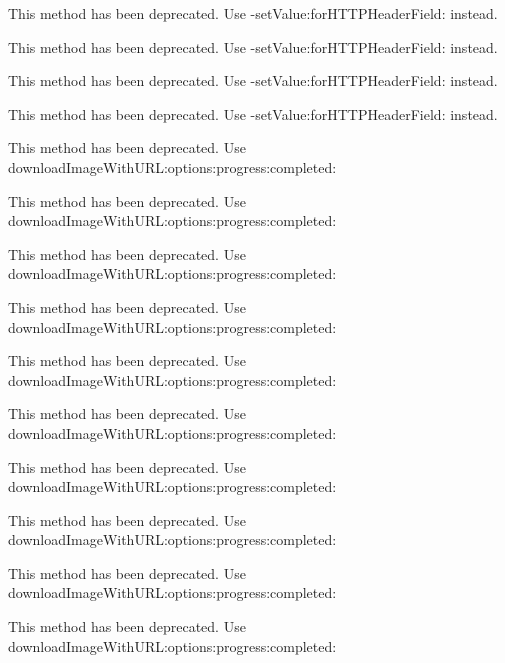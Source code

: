 \begin{DoxyRefList}
This method has been deprecated. Use -\/set\+Value\+:for\+H\+T\+T\+P\+Header\+Field\+: instead. 

This method has been deprecated. Use -\/set\+Value\+:for\+H\+T\+T\+P\+Header\+Field\+: instead. 

This method has been deprecated. Use -\/set\+Value\+:for\+H\+T\+T\+P\+Header\+Field\+: instead. 

This method has been deprecated. Use -\/set\+Value\+:for\+H\+T\+T\+P\+Header\+Field\+: instead.  
\item[\label{deprecated__deprecated000021}%
\Hypertarget{deprecated__deprecated000021}%
\mbox{\hyperlink{category_s_d_web_image_manager_07_deprecated_08_a6ed93377fa34b44c02bce84279529dad}{\mbox{[}S\+D\+Web\+Image\+Manager(Deprecated) download\+With\+U\+RL\+:options\+:progress\+:completed\+:\mbox{]}}} ]This method has been deprecated. Use {\ttfamily download\+Image\+With\+U\+R\+L\+:options\+:progress\+:completed\+:} 

This method has been deprecated. Use {\ttfamily download\+Image\+With\+U\+R\+L\+:options\+:progress\+:completed\+:} 

This method has been deprecated. Use {\ttfamily download\+Image\+With\+U\+R\+L\+:options\+:progress\+:completed\+:} 

This method has been deprecated. Use {\ttfamily download\+Image\+With\+U\+R\+L\+:options\+:progress\+:completed\+:} 

This method has been deprecated. Use {\ttfamily download\+Image\+With\+U\+R\+L\+:options\+:progress\+:completed\+:}  
\item[\label{deprecated__deprecated000021}%
\Hypertarget{deprecated__deprecated000021}%
\mbox{\hyperlink{category_s_d_web_image_manager_07_deprecated_08_a6ed93377fa34b44c02bce84279529dad}{\mbox{[}S\+D\+Web\+Image\+Manager(Deprecated) download\+With\+U\+RL\+:options\+:progress\+:completed\+:\mbox{]}}} ]This method has been deprecated. Use {\ttfamily download\+Image\+With\+U\+R\+L\+:options\+:progress\+:completed\+:} 

This method has been deprecated. Use {\ttfamily download\+Image\+With\+U\+R\+L\+:options\+:progress\+:completed\+:} 

This method has been deprecated. Use {\ttfamily download\+Image\+With\+U\+R\+L\+:options\+:progress\+:completed\+:} 

This method has been deprecated. Use {\ttfamily download\+Image\+With\+U\+R\+L\+:options\+:progress\+:completed\+:} 

This method has been deprecated. Use {\ttfamily download\+Image\+With\+U\+R\+L\+:options\+:progress\+:completed\+:} 
\end{DoxyRefList}